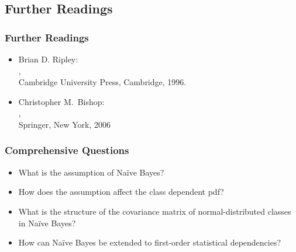 

\subsection{Further Readings}

\begin{frame}
  \frametitle{Further Readings}

  \begin{itemize}
    \item Brian D. Ripley: \\
      , \\
      Cambridge University Press, Cambridge, 1996.\\[.3cm]
    \item Christopher M.\ Bishop: \\
      , \\ 
      Springer, New York, 2006
  \end{itemize}
\end{frame}


\begin{frame}
  \frametitle{Comprehensive Questions}

  \begin{itemize}
    \item What is the assumption of Na{\"i}ve Bayes? \\[1cm]
    \item How does the assumption affect the class dependent pdf? \\[1cm]
    \item What is the structure of the covariance matrix of normal-distributed classes in Na{\"i}ve Bayes? \\[1cm]
    \item How can Na{\"i}ve Bayes be extended to first-order statistical dependencies?
  \end{itemize}
\end{frame}
